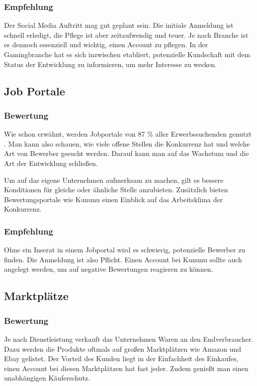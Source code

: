 \subsubsection*{Empfehlung}

Der Social Media Auftritt mag gut geplant sein. Die initiale Anmeldung ist schnell erledigt, die Pflege ist aber zeitaufwendig und teuer. Je nach Branche ist es dennoch essenziell und wichtig, einen Account zu pflegen. In der Gamingbranche hat es sich inzwischen etabliert, potenzielle Kundschaft mit dem Status der Entwicklung zu informieren, um mehr Interesse zu wecken.


\subsection{Job Portale}
\subsubsection*{Bewertung}
Wie schon erwähnt, werden Jobportale von 87 \% aller Erwerbssuchenden genutzt \cite{stepstone}. Man kann also schauen, wie viele offene Stellen die Konkurrenz hat und welche Art von Bewerber gesucht werden. Darauf kann man auf das Wachstum und die Art der Entwicklung schließen.

Um auf das eigene Unternehmen aufmerksam zu machen, gilt es bessere Konditionen für gleiche oder ähnliche Stelle anzubieten. Zusätzlich bieten Bewertungsportale wie Kununu einen Einblick auf das Arbeitsklima der Konkurrenz.
\subsubsection*{Empfehlung}
Ohne ein Inserat in einem Jobportal wird es schwierig, potenzielle Bewerber zu finden. Die Anmeldung ist also Pflicht. Einen Account bei Kununu sollte auch angelegt werden, um auf negative Bewertungen reagieren zu können.


\subsection{Marktplätze}
\subsubsection*{Bewertung}
Je nach Dienstleistung verkauft das Unternehmen Waren an den Endverbraucher. Dazu werden die Produkte oftmals auf großen Marktplätzen wie Amazon und Ebay gelistet. Der Vorteil des Kunden liegt in der Einfachheit des Einkaufes, einen Account bei diesen Marktplätzen hat fast jeder. Zudem genießt man einen unabhängigen Käuferschutz.

